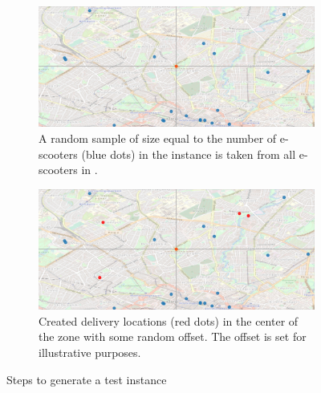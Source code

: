 \begin{figure}[h]
\begin{subfigure}{0.49\textwidth}
     \end{subfigure}
     \hfill
     \begin{subfigure}{0.49\textwidth}
         \centering
         \includegraphics[width=\textwidth]{Images/map_scooters.png}
         \caption{A random sample of size equal to the number of e-scooters (blue dots) in the instance is taken from all e-scooters in .}
         \label{fig:instance_example:scoooters}
     \end{subfigure}
     \hfill
     \begin{subfigure}{0.49\textwidth}
         \centering
         \includegraphics[width=\textwidth]{Images/map_locations.png}
         \caption{Created delivery locations (red dots) in the center of the zone with some random offset. The offset is set for illustrative purposes.}
         \label{fig:instance_example:loc}
     \end{subfigure}

    \caption{Steps to generate a test instance}
    \label{fig:instance_example}
\end{figure}
\break


